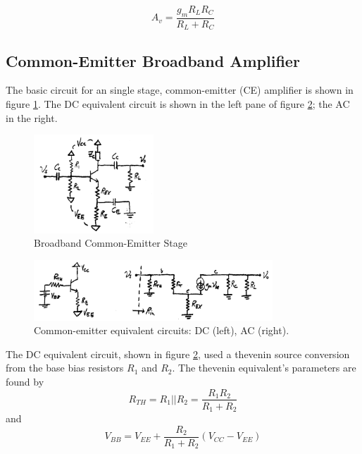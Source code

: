 \documentclass[titlepage, letterpaper, 11pt]{article}
\begin{document}
\begin{equation}
A_{v}=\frac{g_{m}R_{L}R_{C}}{R_{L}+R_{C}}
\label{cbAv}
\end{equation}

\subsection{Common-Emitter Broadband Amplifier}

The basic circuit for an single stage, common-emitter (CE)
amplifier is shown in figure \ref{commonEmitterAmplifier}.
The DC equivalent circuit is shown in the left pane of figure
\ref{commonEmitterEquivalentCircuits}; the AC in the right.

\begin{figure}[ht]
	\centering
	\includegraphics[width=0.4\textwidth]
		{figures/commonEmitterAmplifier.png}
	\caption{
		Broadband Common-Emitter Stage
	}
	\label{commonEmitterAmplifier}
\end{figure}

\begin{figure}[ht]
	\centering
	\includegraphics[width=0.8\textwidth]
		{figures/commonEmitterEquivalentCircuits}
	\caption{
		Common-emitter equivalent circuits: DC (left),
		AC (right).
	}
	\label{commonEmitterEquivalentCircuits}
\end{figure}

The DC equivalent circuit, shown in figure
\ref{commonEmitterEquivalentCircuits}, used a thevenin source
conversion from the base bias resistors $R_{1}$ and $R_{2}$. The
thevenin equivalent's parameters are found by
\begin{equation}
R_{TH}=R_{1}||R_{2}=\frac{R_{1}R_{2}}{R_{1}+R_{2}}
\end{equation}
and
\begin{equation}
V_{BB}=V_{EE}+\frac{R_{2}}{R_{1}+R_{2}}(V_{CC}-V_{EE})
\end{equation}
\end{document}
